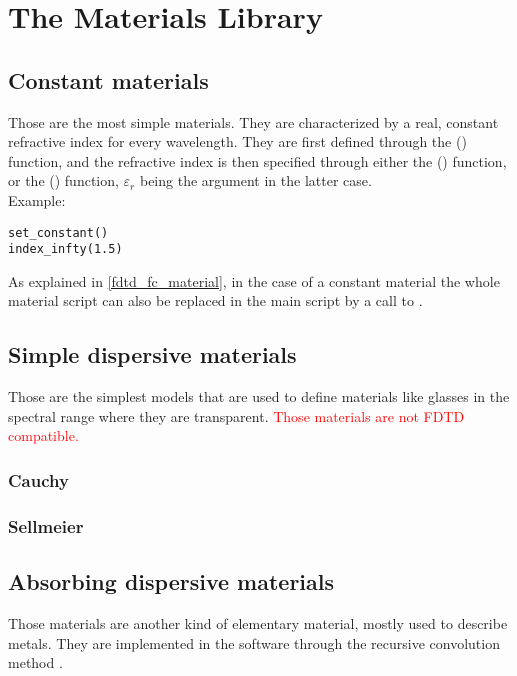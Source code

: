 \chapter{The Materials Library}
\label{matsection}

\section{Constant materials}

Those are the most simple materials. They are characterized by a real, constant refractive index for every wavelength. They are first defined through the () function, and the refractive index is then specified through either the () function, or the () function, $\varepsilon_r$ being the argument in the latter case.\\ Example:

\begin{lstlisting}
set_constant()
index_infty(1.5)
\end{lstlisting}

As explained in \ref{fdtd_fc_material}, in the case of a constant material the whole material script can also be replaced in the main script by a call to .

\section{Simple dispersive materials}

Those are the simplest models that are used to define materials like glasses in the spectral range where they are transparent. \textcolor{red}{Those materials are not FDTD compatible.}

\subsection{Cauchy}

\subsection{Sellmeier}

\section{Absorbing dispersive materials}

	Those materials are another kind of elementary material, mostly used to describe metals. They are implemented in the software through the recursive convolution method \cite{Luebbers:90}.
	
